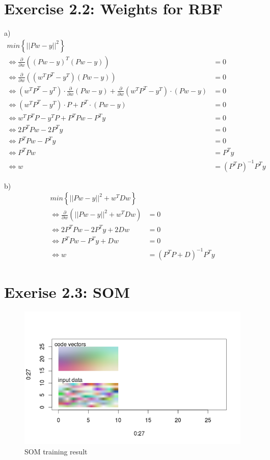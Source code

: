 \documentclass{scrartcl}
\begin{document}
\section{Exercise 2.2: Weights for RBF}

a)
\begin{align*}
  min \left\{ || P w-y ||^2\right\} &\\
 \Leftrightarrow  \frac{\partial}{\partial w} \left( (P w-y)^T (P w-y)\right) & = 0 \\
 \Leftrightarrow  \frac{\partial}{\partial w} \left( (w^T P^T -y^T) (P w-y)\right) & = 0 \\
 \Leftrightarrow  (w^T P^T -y^T) \cdot \frac{\partial}{\partial w} \left( P w-y\right) + \frac{\partial}{\partial w} \left( w^T P^T -y^T \right) \cdot (P w-y) & = 0 \\
 \Leftrightarrow  (w^T P^T -y^T) \cdot  P + P^T \cdot (P w-y) & = 0 \\
 \Leftrightarrow  w^T P^T P - y^T P + P^T P w - P^T y & = 0  \\
 \Leftrightarrow  2 P^T P w - 2 P^T y & = 0 \\
 \Leftrightarrow  P^T P w - P^T y & = 0 \\
 \Leftrightarrow  P^T P w & = P^T y \\
 \Leftrightarrow w & = (P^T P)^{-1} P^T y
\end{align*}

b)
\begin{align*}
      min \left\{ || P w-y ||^2 + w^T D w \right\} &\\
     \Leftrightarrow  \frac{\partial}{\partial w} \left(|| P w-y ||^2 + w^T D w\right) & = 0 \\
     \Leftrightarrow  2 P^T P w - 2 P^T y + 2 D w & = 0 \\
     \Leftrightarrow  P^T P w - P^T y + D w& = 0 \\
     \Leftrightarrow w & = (P^T P + D)^{-1} P^T y
\end{align*}


\section{Exerise 2.3: SOM}

\begin{figure}[H]
    \centering
\includegraphics[width=\pagewidth]{img/2_3som_sub.png}
    \caption{SOM training result}
\end{figure}
\end{document}
